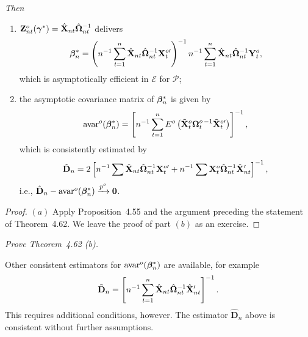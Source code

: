 \begin{theorem}[Efficient IV]
\emph{Then}
\begin{enumerate}[label=(\alph*)]
\item $\mathbf{Z}_{nt}^o(\boldsymbol{\gamma}^*) = \hat{\mathbf{X}}_{nt}\hat{\boldsymbol{\Omega}}_{nt}^{-1}$ delivers
\[
\boldsymbol{\beta}_n^* = \left(n^{-1}\sum_{t=1}^{n}\hat{\mathbf{X}}_{nt}\hat{\boldsymbol{\Omega}}_{nt}^{-1}\mathbf{X}_t^{o\prime}\right)^{-1}n^{-1}\sum_{t=1}^{n}\hat{\mathbf{X}}_{nt}\hat{\boldsymbol{\Omega}}_{nt}^{-1}\mathbf{Y}_t^o,
\]
which is asymptotically efficient in $\mathcal{E}$ for $\mathcal{P}$;
\item the asymptotic covariance matrix of $\boldsymbol{\beta}_n^*$ is given by
\[
\mathrm{avar}^o(\boldsymbol{\beta}_n^*) = \left[n^{-1}\sum_{t=1}^{n}E^o\left(\tilde{\mathbf{X}}_t^o\boldsymbol{\Omega}_t^{o\,-1}\tilde{\mathbf{X}}_t^{o\prime}\right)\right]^{-1},
\]
which is consistently estimated by
\[
\hat{\mathbf{D}}_n = 2\left[n^{-1}\sum \hat{\mathbf{X}}_{nt}\hat{\boldsymbol{\Omega}}_{nt}^{-1}\mathbf{X}_t^{o\prime} + n^{-1}\sum \mathbf{X}_t^o\hat{\boldsymbol{\Omega}}_{nt}^{-1}\hat{\mathbf{X}}_{nt}'\right]^{-1},
\]
i.e., $\hat{\mathbf{D}}_n - \mathrm{avar}^o(\boldsymbol{\beta}_n^*) \xrightarrow{p^o} \mathbf{0}$.
\end{enumerate}
\end{theorem}

\begin{proof}
$(a)$ Apply Proposition~4.55 and the argument preceding the statement of Theorem~4.62. We leave the proof of part $(b)$ as an exercise.
\end{proof}

\begin{exercises}
\item\label{ex:4.63} \textit{Prove Theorem~4.62 (b).}
\end{exercises}

Other consistent estimators for $\mathrm{avar}^o(\boldsymbol{\beta}_n^*)$ are available, for example
\[
\tilde{\mathbf{D}}_n = \left[n^{-1}\sum_{t=1}^{n}\hat{\mathbf{X}}_{nt}\hat{\boldsymbol{\Omega}}_{nt}^{-1}\hat{\mathbf{X}}_{nt}'\right]^{-1}.
\]
This requires additional conditions, however. The estimator $\hat{\mathbf{D}}_n$ above is
consistent without further assumptions.

